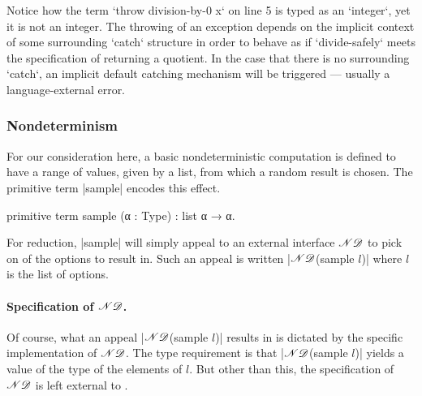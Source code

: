 Notice how the term \code`throw division-by-0 x` on line 5 is typed as an \code`integer`, yet it is not an integer.
The throwing of an exception depends on the implicit context of some surrounding \code`catch` structure in order to behave as if \code`divide-safely` meets the specification of returning a quotient.
In the case that there is no surrounding \code`catch`, an implicit default catching mechanism will be triggered --- usually a language-external error.

\subsubsection{Nondeterminism}


For our consideration here, a basic nondeterministic computation is defined to have a range of values, given by a list, from which a random result is chosen.
The primitive term \code|sample| encodes this effect.
\begin{program}[caption={Primitive for nondeterminism}]
primitive term sample (α : Type) : list α → α.
\end{program}
%
%
%
%
For reduction, \code|sample| will simply appeal to an external interface $\mathscr{ND}$ to pick on of the options to result in.
Such an appeal is written \code|$\mathscr{ND}$(sample $l$)| where $l$ is the list of options.


\paragraph{Specification of $\mathscr{ND}$.}
%
Of course, what an appeal \code|$\mathscr{ND}$(sample $l$)| results in is dictated by the specific implementation of $\mathscr{ND}$.
The type requirement is that \code|$\mathscr{ND}$(sample $l$)| yields a value of the type of the elements of $l$.
But other than this, the specification of $\mathscr{ND}$ is left external to \LangB.

